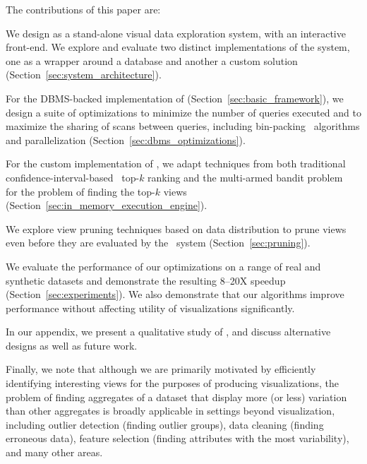 The contributions of this paper are:
\begin{denselist}
  \item We design \VizRecDB as a stand-alone visual data exploration system,
  with an interactive front-end. We explore and evaluate two distinct implementations of the system, one as a
  wrapper around a database and another a custom solution (Section~\ref{sec:system_architecture}).
  \item For the DBMS-backed implementation of \VizRecDB (Section~\ref{sec:basic_framework}), we
  design a suite of optimizations to minimize the number of queries executed and to
  maximize the sharing of scans between queries, 
  including bin-packing~\cite{garey} algorithms and parallelization
  (Section~\ref{sec:dbms_optimizations}).
  \item For the custom implementation of \VizRecDB,  we adapt techniques 
  from both traditional confidence-interval-based~\cite{hoeffding1963probability} top-$k$ ranking and the
   multi-armed bandit problem~\cite{bandits} 
   for the problem of finding the top-$k$ views (Section~\ref{sec:in_memory_execution_engine}).
  \item We explore view pruning techniques based on data distribution
  to prune views even before they are evaluated by the \VizRecDB\ system 
  (Section~\ref{sec:pruning}).
  \item We evaluate the performance of our optimizations on a range of
  real and synthetic datasets and demonstrate the resulting 8--20X speedup 
  (Section~\ref{sec:experiments}). We also demonstrate that our algorithms
  improve performance without affecting utility of visualizations significantly.
\end{denselist}
In our appendix, we present a qualitative study of \VizRecDB, 
and discuss alternative designs as well as future work.

Finally, we note that although we are primarily motivated by efficiently 
identifying interesting views for the purposes of producing visualizations, 
the problem of finding aggregates of a dataset that display more (or less) variation
than other aggregates is broadly applicable in settings beyond visualization, including
outlier detection (finding outlier groups), data cleaning (finding erroneous 
data), feature selection (finding attributes with the most variability), and 
many other areas.






